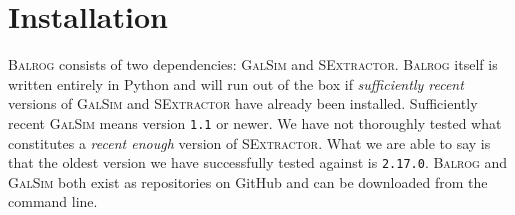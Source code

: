 \documentclass[11pt]{book}
\newcommand{\codett}[1]{\lstinline{#1}}
\newcommand{\py}{Python}
\newcommand{\galsim}{\textsc{GalSim}}
\newcommand{\balrog}{\textsc{Balrog}}
\newcommand{\sex}{\textsc{SExtractor}}
\newcommand{\opt}[1]{\codett{--#1}}
\newcommand{\ericdate}{\mydate\today}
\begin{document}



\chapter{Installation}
\label{sec:install}

\balrog{} consists of two dependencies: \galsim{} and \sex{}.
\balrog{} itself is written entirely in \py{} and will run out of the box if  
\emph{sufficiently recent} versions of \galsim{} and \sex{} have already been installed.
Sufficiently recent \galsim{} means version \codett{1.1} or newer.
We have not thoroughly tested what constitutes a \emph{recent enough} version of \sex{}.
What we are able to say is that the oldest version we have successfully tested against is \codett{2.17.0}.
\balrog{} and \galsim{} both exist as repositories on GitHub and can be downloaded 
from the command line.
\end{document}

